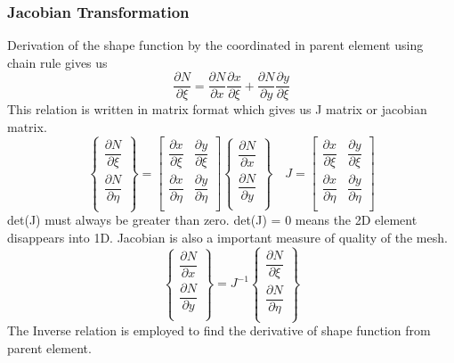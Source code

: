\documentclass[9pt]{beamer}
\begin{document}
\begin{frame}
\frametitle{Jacobian Transformation}
Derivation of the shape function by the coordinated in parent element using chain rule gives us
\begin{equation*}
\dfrac{\partial N }{ \partial \xi } = 
\dfrac{\partial N }{ \partial x }
\dfrac{ \partial x }{\partial \xi }  
+
\dfrac{\partial N }{ \partial y }
\dfrac{ \partial y }{\partial \xi } 
\end{equation*}
This relation is written in matrix format which gives us J matrix or jacobian matrix. 
\begin{equation*}
\left\{
\begin{array}{r}
\dfrac{\partial N }{ \partial \xi }  \\
\dfrac{\partial N }{ \partial \eta }  \\
\end{array}
\right\}
=
\begin{bmatrix}
\dfrac{ \partial x }{\partial \xi }   &
\dfrac{ \partial y }{\partial \xi } \\
\dfrac{ \partial x }{\partial \eta }   &
\dfrac{ \partial y }{\partial \eta } \\
\end{bmatrix}
\left\{
\begin{array}{r}
\dfrac{\partial N }{ \partial x }  \\
\dfrac{\partial N }{ \partial y }  \\
\end{array}
\right\}
\quad
J=\begin{bmatrix}
\dfrac{ \partial x }{\partial \xi }   &
\dfrac{ \partial y }{\partial \xi } \\
\dfrac{ \partial x }{\partial \eta }   &
\dfrac{ \partial y }{\partial \eta } \\
\end{bmatrix}
\end{equation*}
det(J) must always be greater than zero. det(J) = 0  means the 2D element disappears into 1D. Jacobian is also a important measure of quality of the mesh.
\begin{equation*}
\left\{
\begin{array}{r}
\dfrac{\partial N }{ \partial x }  \\
\dfrac{\partial N }{ \partial y }  \\
\end{array}
\right\}
=
J^{-1}
\left\{
\begin{array}{r}
\dfrac{\partial N }{ \partial \xi }  \\
\dfrac{\partial N }{ \partial \eta }  \\
\end{array}
\right\}
\end{equation*}
The Inverse relation is employed to find the derivative of shape function from parent element.
\end{frame}
\end{document}
